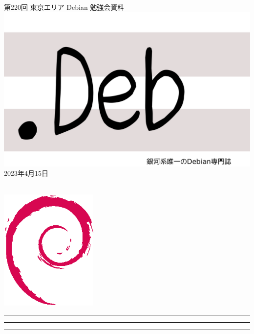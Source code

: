 \documentclass[mingoth,a4paper]{jsarticle}
\newcommand{\debmtgyear}{2023}
\newcommand{\debmtgmonth}{4}
\newcommand{\debmtgdate}{15}
\newcommand{\debmtgnumber}{220}
\begin{document}
\begin{titlepage}
\thispagestyle{empty}

\vspace*{-2cm}
第\debmtgnumber{}回 東京エリア Debian 勉強会資料\\
\hspace*{-2cm}
\includegraphics{image-assets/dotdeb.pdf}\\
\hfill{}\debmtgyear{}年\debmtgmonth{}月\debmtgdate{}日

\\

\vspace*{-2cm}
\hfill{}\includegraphics[height=6cm]{image-assets/openlogo-nd.eps}
\end{titlepage}

\newpage

\begin{minipage}[b]{0.2\hsize}
 \colorbox{titleback}{}
\end{minipage}
\begin{minipage}[b]{0.8\hsize}
\hrule
\vspace{2mm}
\hrule
\begin{multicols}{2}
\tableofcontents
\end{multicols}
\vspace{2mm}
\hrule
\end{minipage}
\end{document}
